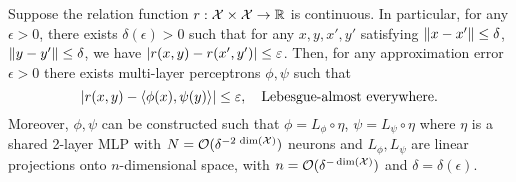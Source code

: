 \begin{theorem}\label{theorem:asymemtric_inner_prod_rel_func_class}
    Suppose the relation function $r: {\mathcal{X}} \times {\mathcal{X}} \to \mathbb{R}$ is continuous. In particular, for any $\epsilon > 0$, there exists $\delta(\epsilon) > 0$ such that for any $x, y, x', y'$ satisfying $\left\lVert x - x'\right\rVert \leq \delta$, $\left\lVert y - y'\right\rVert \leq \delta$, we have $\left\lvert r(x, y) - r(x', y')\right\rvert \leq \varepsilon$. Then, for any approximation error $\epsilon > 0$ there exists multi-layer perceptrons $\phi, \psi$ such that
    \begin{equation*}
        \abs{r(x,y) - \iprod{\phi(x)}{\psi(y)}} \leq \epsilon, \quad \text{Lebesgue-almost everywhere.}
    \end{equation*}
    Moreover, $\phi, \psi$ can be constructed such that $\phi = L_\phi \circ \eta$, $\psi = L_\psi \circ \eta$ where $\eta$ is a shared 2-layer MLP with $N = {\mathcal{O}}(\delta^{- 2 \,\dim({\mathcal{X}})})$ neurons and $L_\phi, L_\psi$ are linear projections onto $n$-dimensional space, with $n = {\mathcal{O}}(\delta^{- \dim({\mathcal{X}})})$ and $\delta = \delta(\epsilon)$.
\end{theorem}
